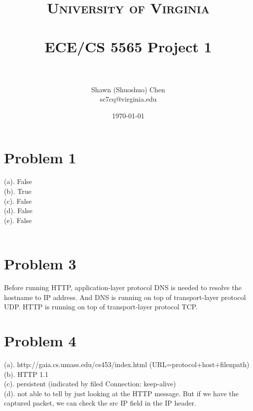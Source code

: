 \documentclass[titlepage, paper=a4, fontsize=11pt]{scrartcl} %
\title{	
\normalfont \normalsize 
\textsc{University of Virginia} \\ [25pt] %
\horrule{0.5pt} \\[0.4cm] %
\huge ECE/CS 5565 Project 1 \\ %
\horrule{2pt} \\[0.5cm] %
}
\author{Shawn (Shuoshuo) Chen\\sc7cq@virginia.edu} %
\date{\normalsize\today} %
\numberwithin{equation}{section} %
\numberwithin{figure}{section} %
\numberwithin{table}{section} %
\begin{document}
\maketitle %


\section*{Problem 1}

(a). False \\
(b). True \\
(c). False \\
(d). False \\
(e). False \\
\\



\section*{Problem 3}
Before running HTTP, application-layer protocol DNS is needed to resolve the hostname to IP address.
And DNS is running on top of transport-layer protocol UDP. HTTP is running on top of transport-layer
protocol TCP.
\\



\section*{Problem 4}
(a). http://gaia.cs.umass.edu/cs453/index.html  (URL=protocol+host+filenpath) \\

(b). HTTP 1.1 \\

(c). persistent (indicated by filed Connection: keep-alive) \\

(d). not able to tell by just looking at the HTTP message. But if we have the captured packet, we can check the src IP field in the IP header. \\
\end{document}
